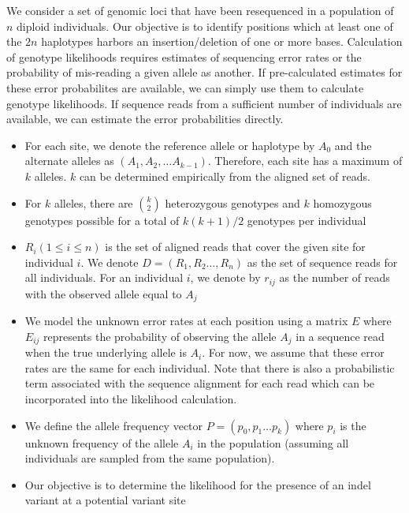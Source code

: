 \documentclass{article}
\begin{document}
We consider a set of genomic loci that have been resequenced in a
population of $n$ diploid individuals. Our objective is to identify positions which at least one of the $2n$ haplotypes harbors an insertion/deletion of one or more bases. Calculation of genotype likelihoods requires estimates of sequencing error rates or the probability of mis-reading a given allele as another. If pre-calculated estimates for these error probabilites are available, we can simply use them to calculate genotype likelihoods. If sequence reads from a sufficient number of individuals are available, we can estimate the error probabilities directly.

\begin{itemize}
\item For each site, we denote the reference allele or haplotype by $A_0$ and the alternate alleles as $(A_1, A_2, \ldots A_{k-1})$. Therefore, each site has a maximum of $k$ alleles.  $k$ can be determined empirically from the aligned set of reads. 

\item For $k$ alleles, there are $k \choose 2$ heterozygous genotypes and $k$ homozygous genotypes possible for a total of $k(k+1)/2$ genotypes per individual


\item $R_i (1\leq i \leq n)$ is the set of aligned reads that cover the given site for individual $i$. We denote $D = (R_1,R_2\ldots, R_n)$ as the set of sequence reads for all individuals. For an individual $i$, we denote by $r_{ij}$ as the number of reads with the observed allele equal to $A_j$

\item We model the unknown error rates at each position using a matrix $E$ where $E_{ij}$ represents the probability of observing the allele $A_j$ in a sequence read when the true underlying allele is $A_i$. For now, we assume that these error rates are the same for each individual. Note that there is also a probabilistic term associated with the sequence alignment for each read which can be incorporated into the likelihood calculation. 

\item We define the allele frequency vector $P = (p_0,p_1\ldots p_k)$ where $p_i$ is the unknown frequency of the allele $A_i$ in the population (assuming all individuals are sampled from the same population). 

\item Our objective is to determine the likelihood for the presence of an indel variant at a potential variant site 

\end{itemize}
\end{document}
